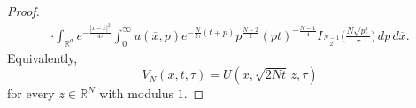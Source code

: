 \documentclass[11pt, twoside, notitlepage]{amsart}
\newcommand\R{\mathbb{R}}
\newcommand\RN{\mathbb{R}^N}
\numberwithin{equation}{section}
\begin{document}
\begin{proof}
\begin{multline}
 \cdot \int_{\R^d}e^{ - \frac{|x-\overline{x}|^2 }{4 \tau} }  \int_0^\infty u(\overline{x}, p )
      e^{ - \frac{  N }{2 \tau} (t+p)}    p^{\frac{N-2}{2} }  (pt)   ^{ - \frac{N-1}{4}}  I_{\frac{N-1}{2}}\Big(\frac{ N  \sqrt{pt}  }{ \tau} \Big)\, d p \,d \overline{x}.
\end{multline}
%
Equivalently,
$$
V_N(x,t,\tau)=U(x,\sqrt{2N  t}\, z, \tau)$$ for every $z\in \RN$ with modulus $1$.









\medskip


\end{proof}
\end{document}
